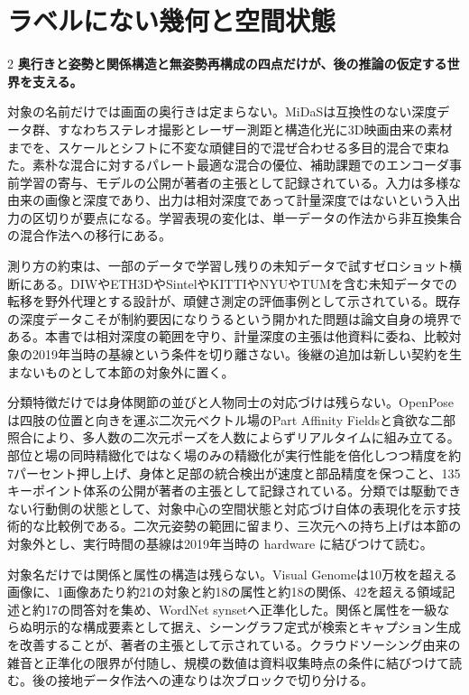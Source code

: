 \documentclass[lualatex,a4paper,10pt]{jlreq}
\begin{document}
\Needspace{0.20\textheight}
\section{ラベルにない幾何と空間状態}
\label{sec:p04}
\begin{multicols}{2}
\raggedcolumns
\noindent\textbf{奥行きと姿勢と関係構造と無姿勢再構成の四点だけが、後の推論の仮定する世界を支える。}\autocite{vmd019,vmd020,vmd021,vmd022}\par\medskip
\noindent 対象の名前だけでは画面の奥行きは定まらない。MiDaSは互換性のない深度データ群、すなわちステレオ撮影とレーザー測距と構造化光に3D映画由来の素材までを、スケールとシフトに不変な頑健目的で混ぜ合わせる多目的混合で束ねた。素朴な混合に対するパレート最適な混合の優位、補助課題でのエンコーダ事前学習の寄与、モデルの公開が著者の主張として記録されている。入力は多様な由来の画像と深度であり、出力は相対深度であって計量深度ではないという入出力の区切りが要点になる。学習表現の変化は、単一データの作法から非互換集合の混合作法への移行にある。\autocite{vmd019}\par\medskip
\noindent 測り方の約束は、一部のデータで学習し残りの未知データで試すゼロショット横断にある。DIWやETH3DやSintelやKITTIやNYUやTUMを含む未知データでの転移を野外代理とする設計が、頑健さ測定の評価事例として示されている。既存の深度データこそが制約要因になりうるという開かれた問題は論文自身の境界である。本書では相対深度の範囲を守り、計量深度の主張は他資料に委ね、比較対象の2019年当時の基線という条件を切り離さない。後継の追加は新しい契約を生まないものとして本節の対象外に置く。\autocite{vmd019}\par\medskip
\noindent 分類特徴だけでは身体関節の並びと人物同士の対応づけは残らない。OpenPoseは四肢の位置と向きを運ぶ二次元ベクトル場のPart Affinity Fieldsと貪欲な二部照合により、多人数の二次元ポーズを人数によらずリアルタイムに組み立てる。部位と場の同時精緻化ではなく場のみの精緻化が実行性能を倍化しつつ精度を約7パーセント押し上げ、身体と足部の統合検出が速度と部品精度を保つこと、135キーポイント体系の公開が著者の主張として記録されている。分類では駆動できない行動側の状態として、対象中心の空間状態と対応づけ自体の表現化を示す技術的な比較例である。二次元姿勢の範囲に留まり、三次元への持ち上げは本節の対象外とし、実行時間の基線は2019年当時の hardware に結びつけて読む。\autocite{vmd020}\par\medskip
\noindent 対象名だけでは関係と属性の構造は残らない。Visual Genomeは10万枚を超える画像に、1画像あたり約21の対象と約18の属性と約18の関係、42を超える領域記述と約17の問答対を集め、WordNet synsetへ正準化した。関係と属性を一級ならぬ明示的な構成要素として据え、シーングラフ定式が検索とキャプション生成を改善することが、著者の主張として示されている。クラウドソーシング由来の雑音と正準化の限界が付随し、規模の数値は資料収集時点の条件に結びつけて読む。後の接地データ作法への連なりは次ブロックで切り分ける。\autocite{vmd021}\par\medskip

\end{multicols}
\end{document}
